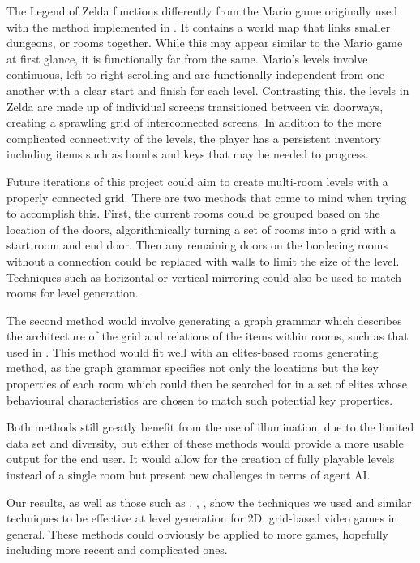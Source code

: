 \documentclass{article}
\begin{document}
The Legend of Zelda functions differently from the Mario game originally used with the method implemented in \cite{Fontaine2020}. It contains a world map that links smaller dungeons, or rooms together. While this may appear similar to the Mario game at first glance, it is functionally far from the same. Mario's levels involve continuous, left-to-right scrolling and are functionally independent from one another with a clear start and finish for each level. Contrasting this, the levels in Zelda are made up of individual screens transitioned between via doorways, creating a sprawling grid of interconnected screens. In addition to the more complicated connectivity of the levels, the player has a persistent inventory including items such as bombs and keys that may be needed to progress.

Future iterations of this project could aim to create multi-room levels with a properly connected grid. There are two methods that come to mind when trying to accomplish this. First, the current rooms could be grouped based on the location of the doors, algorithmically turning a set of rooms into a grid with a start room and end door. Then any remaining doors on the bordering rooms without a connection could be replaced with walls to limit the size of the level. Techniques such as horizontal or vertical mirroring could also be used to match rooms for level generation.

The second method would involve generating a graph grammar which describes the architecture of the grid and relations of the items within rooms, such as that used in \cite{gutierrez2020}. This method would fit well with an elites-based rooms generating method, as the graph grammar specifies not only the locations but the key properties of each room which could then be searched for in a set of elites whose behavioural characteristics are chosen to match such potential key properties.

Both methods still greatly benefit from the use of illumination, due to the limited data set and diversity, but either of these methods would provide a more usable output for the end user. It would allow for the creation of fully playable levels instead of a single room but present new challenges in terms of agent AI.

Our results, as well as those such as \cite{Fontaine2020}, \cite{steckel2021}, \cite{sarkar2021}, show the techniques we used and similar techniques to be effective at level generation for 2D, grid-based video games in general. These methods could obviously be applied to more games, hopefully including more recent and complicated ones.
\end{document}
